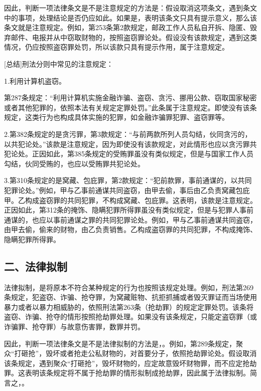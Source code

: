 因此，判断一项法律条文是不是注意规定的方法是：假设取消这项条文，遇到条文中的事项，处理结论是否仍应如此。如果是，表明该条文只具有提示意义，那么该条文就是注意规定。例如，第253条第2款规定，邮政工作人员私自开拆、隐匿、毁弃邮件、电报并从中窃取财物的，按照盗窃罪论处。假设没有该款规定，遇到这类情况，仍应按照盗窃罪处罚，所以该款只具有提示作用，属于注意规定。

[总结]刑法分则中常见的注意规定：

1.利用计算机盗窃。

第287条规定：“利用计算机实施金融诈骗、盗窃、贪污、挪用公款、窃取国家秘密或者其他犯罪的，依照本法有关规定定罪处罚。”此条属于注意规定。即使没有该条规定，这类行为也构成具体实施的犯罪，如金融诈骗罪犯罪、盗窃罪等。

2.第382条规定的是贪污罪，第3款规定：“与前两款所列人员勾结，伙同贪污的，以共犯论处。”该款是注意规定，因为即使没有该款规定，对此情形也应以贪污罪共犯论处。正因如此，第385条规定的受贿罪虽没有类似规定，但是与国家工作人员勾结，伙同受贿的，也应以受贿罪共犯论处。

3.第310条规定的是窝藏、包庇罪，第2款规定：“犯前款罪，事前通谋的，以共同犯罪论处。”例如，甲与乙事前通谋共同盗窃，由甲去偷，事后由乙负责窝藏包庇甲。乙构成盗窃罪的共同犯罪，不构成窝藏、包庇罪。这表明，该款是注意规定。正因如此，第312条的掩饰、隐瞒犯罪所得罪虽没有类似规定，但是与犯罪人事前通谋的，也应以事前通谋之罪的共同犯罪论处。例如，甲与乙事前通谋共同盗窃，由甲去偷，偷来的财物，由乙负责销售。乙构成盗窃罪的共同犯罪，不构成掩饰、隐瞒犯罪所得罪。

\subsection*{二、法律拟制}

法律拟制，是将原本不符合某种规定的行为也按照该规定处理。例如，刑法第269条规定，犯盗窃、诈骗、抢夺罪，为窝藏赃物、抗拒抓捕或者毁灭罪证而当场使用暴力或者以暴力相威胁的，依照刑法第263条（抢劫罪）的规定定罪处罚。该条将盗窃、诈骗、抢夺的情形按照抢劫罪处理。如果没有该条规定，只能定盗窃罪（或诈骗罪、抢夺罪）与故意伤害罪，数罪并罚。

因此，判断一项法律条文是不是法律拟制的方法是，。例如，第289条规定，聚众“打砸抢”，毁坏或者抢走公私财物的，对首要分子，依照抢劫罪论处。假设取消该条规定，遇到聚众“打砸抢”，毁坏财物的，应定故意毁坏财物罪，而不应定抢劫罪。这表明该条规定将不属于抢劫罪的情形拟制成抢劫罪，因此属于法律拟制。简言之，。

